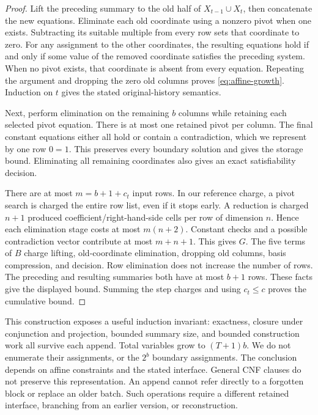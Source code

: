 \documentclass[11pt,a4paper]{article}
\numberwithin{equation}{section}
\theoremstyle{plain}
\theoremstyle{definition}
\theoremstyle{remark}
\begin{document}
\begin{proof}
Lift the preceding summary to the old half of $X_{t-1}\cup X_t$, then concatenate the new equations. Eliminate each old coordinate using a nonzero pivot when one exists. Subtracting its suitable multiple from every row sets that coordinate to zero. For any assignment to the other coordinates, the resulting equations hold if and only if some value of the removed coordinate satisfies the preceding system. When no pivot exists, that coordinate is absent from every equation. Repeating the argument and dropping the zero old columns proves \eqref{eq:affine-growth}. Induction on $t$ gives the stated original-history semantics.

Next, perform elimination on the remaining $b$ columns while retaining each selected pivot equation. There is at most one retained pivot per column. The final constant equations either all hold or contain a contradiction, which we represent by one row $0=1$. This preserves every boundary solution and gives the storage bound. Eliminating all remaining coordinates also gives an exact satisfiability decision.

There are at most $m=b+1+c_t$ input rows. In our reference charge, a pivot search is charged the entire row list, even if it stops early. A reduction is charged $n+1$ produced coefficient/right-hand-side cells per row of dimension $n$. Hence each elimination stage costs at most $m(n+2)$. Constant checks and a possible contradiction vector contribute at most $m+n+1$. This gives $G$. The five terms of $B$ charge lifting, old-coordinate elimination, dropping old columns, basis compression, and decision. Row elimination does not increase the number of rows. The preceding and resulting summaries both have at most $b+1$ rows. These facts give the displayed bound. Summing the step charges and using $c_t\leq c$ proves the cumulative bound.
\end{proof}

This construction exposes a useful induction invariant: exactness, closure under conjunction and projection, bounded summary size, and bounded construction work all survive each append. Total variables grow to $(T+1)b$. We do not enumerate their assignments, or the $2^b$ boundary assignments. The conclusion depends on affine constraints and the stated interface. General CNF clauses do not preserve this representation. An append cannot refer directly to a forgotten block or replace an older batch. Such operations require a different retained interface, branching from an earlier version, or reconstruction.
\end{document}
